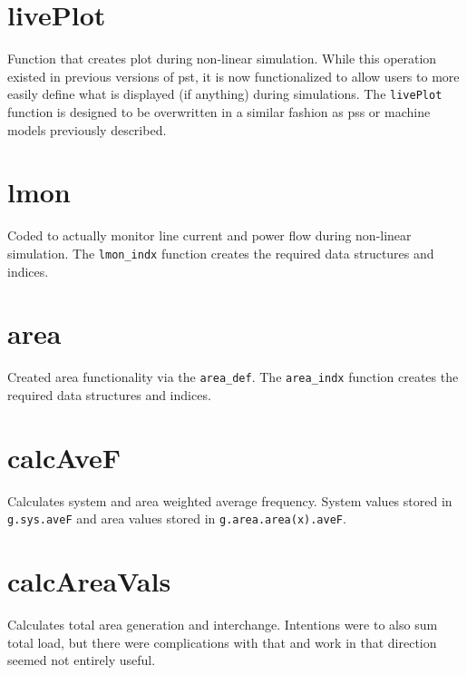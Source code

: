 \section{livePlot}  
Function that creates plot during non-linear simulation.
While this operation existed in previous versions of pst, it is now functionalized to allow users to more easily define what is displayed (if anything) during simulations.
The \verb|livePlot| function is designed to be overwritten in a similar fashion as pss or machine models previously described.

\section{lmon}  
Coded to actually monitor line current and power flow during non-linear simulation.
The \verb|lmon_indx| function creates the required data structures and indices.
\section{area}  
Created area functionality via the \verb|area_def|.
The \verb|area_indx| function creates the required data structures and indices.

\section{calcAveF}  
Calculates system and area weighted average frequency.
System values stored in \verb|g.sys.aveF| and area values stored in \verb|g.area.area(x).aveF|.

\section{calcAreaVals}  
Calculates total area generation and interchange.
Intentions were to also sum total load, but there were complications with that and work in that direction seemed not entirely useful.

